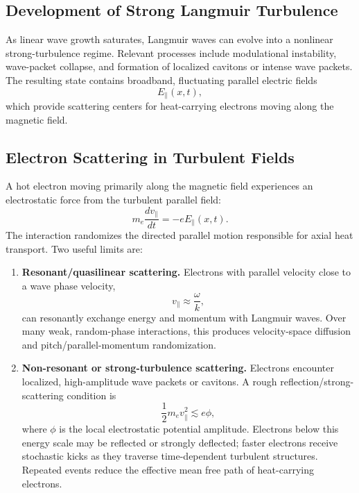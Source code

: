 \documentclass[11pt,a4paper]{article}
\begin{document}
\subsection{Development of Strong Langmuir Turbulence}
As linear wave growth saturates, Langmuir waves can evolve into a nonlinear strong-turbulence regime. Relevant processes include modulational instability, wave-packet collapse, and formation of localized cavitons or intense wave packets. The resulting state contains broadband, fluctuating parallel electric fields
\begin{equation}
    E_\parallel(x,t),
\end{equation}
which provide scattering centers for heat-carrying electrons moving along the magnetic field.

\subsection{Electron Scattering in Turbulent Fields}
A hot electron moving primarily along the magnetic field experiences an electrostatic force from the turbulent parallel field:
\begin{equation}
    m_e \frac{d v_\parallel}{dt} = -e E_\parallel(x,t).
    \label{eq:parallel_force}
\end{equation}
The interaction randomizes the directed parallel motion responsible for axial heat transport. Two useful limits are:

\begin{enumerate}[leftmargin=*]
    \item \textbf{Resonant/quasilinear scattering.} Electrons with parallel velocity close to a wave phase velocity,
    \begin{equation}
        v_\parallel \approx \frac{\omega}{k},
    \end{equation}
    can resonantly exchange energy and momentum with Langmuir waves. Over many weak, random-phase interactions, this produces velocity-space diffusion and pitch/parallel-momentum randomization.

    \item \textbf{Non-resonant or strong-turbulence scattering.} Electrons encounter localized, high-amplitude wave packets or cavitons. A rough reflection/strong-scattering condition is
    \begin{equation}
        \frac{1}{2} m_e v_\parallel^2 \lesssim e\phi,
    \end{equation}
    where $\phi$ is the local electrostatic potential amplitude. Electrons below this energy scale may be reflected or strongly deflected; faster electrons receive stochastic kicks as they traverse time-dependent turbulent structures. Repeated events reduce the effective mean free path of heat-carrying electrons.
\end{enumerate}
\end{document}
